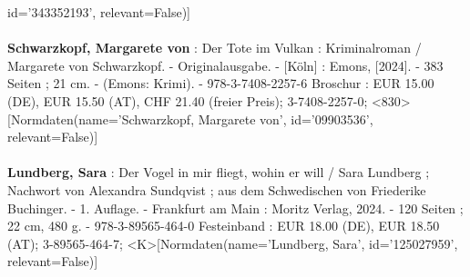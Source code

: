 \documentclass{article}
\begin{document}
\begin{multicols}{3}
id='343352193', relevant=False)]\\\\\textbf{Schwarzkopf, Margarete von} : Der Tote im Vulkan : Kriminalroman / Margarete von Schwarzkopf. - Originalausgabe. - [Köln] : Emons, [2024]. - 383 Seiten ; 21 cm. - (Emons: Krimi). - 978-3-7408-2257-6 Broschur : EUR 15.00 (DE), EUR 15.50 (AT), CHF 21.40 (freier Preis); 3-7408-2257-0; <830>[Normdaten(name='Schwarzkopf, Margarete von', id='09903536', relevant=False)]\\\\\textbf{Lundberg, Sara} : Der Vogel in mir fliegt, wohin er will / Sara Lundberg ; Nachwort von Alexandra Sundqvist ; aus dem Schwedischen von Friederike Buchinger. - 1. Auflage. - Frankfurt am Main : Moritz Verlag, 2024. - 120 Seiten ; 22 cm, 480 g. - 978-3-89565-464-0 Festeinband : EUR 18.00 (DE), EUR 18.50 (AT); 3-89565-464-7; <K>[Normdaten(name='Lundberg, Sara', id='125027959', relevant=False)]
\end{multicols}
\end{document}
